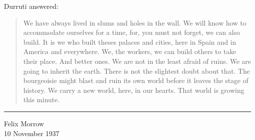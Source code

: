 \smallskip

Durruti answered:

\begin{quotation}
  We have always lived in slums and holes in the wall. We will know how to accommodate ourselves for a time, for\kn, you must not forget, we can also build. It is we who built theses palaces and cities, here in Spain and in America and everywhere. We, the workers, we can build others to take their place. And better ones. We are not in the least afraid of ruins. We are going to inherit the earth. There is not the slightest doubt about that. The bourgeoisie might blast and ruin its own world before it leaves the stage of history. We carry a new world, here, in our hearts. That world is growing this minute.\kn%
\end{quotation}

\vfill

\thispagestyle{empty}

\begin{flushright}
  \rule{0.5\textwidth}{0.8pt}
  
  \bigskip
  
  \textsf{Felix Morrow} \\ 10 November 1937
\end{flushright}
